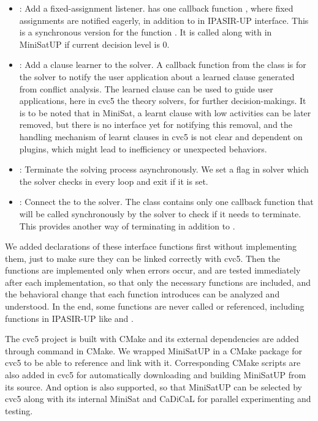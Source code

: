 \begin{itemize}
\begin{itemize}
    \item {}: Add a fixed-assignment listener.  has one callback function , where fixed assignments are notified eagerly, in addition to  in IPASIR-UP interface. This is a synchronous version for the function . It is called along with  in MiniSatUP if current decision level is 0.
    \item {}: Add a clause learner to the solver. A callback function  from the  class is for the solver to notify the user application about a learned clause generated from conflict analysis. The learned clause can be used to guide user applications, here in cvc5 the theory solvers, for further decision-makings. It is to be noted that in MiniSat, a learnt clause with low activities can be later removed, but there is no interface yet for notifying this removal, and the handling mechanism of learnt clauses in cvc5 is not clear and dependent on plugins, which might lead to inefficiency or unexpected behaviors.
    \item {}: Terminate the solving process asynchronously. We set a flag in solver which the solver checks in every loop and exit if it is set.
    \item {}: Connect the  to the solver. The  class contains only one callback function  that will be called synchronously by the solver to check if it needs to terminate. This provides another way of terminating in addition to .
  \end{itemize}
\end{itemize}

We added declarations of these interface functions first without implementing them, just to make sure they can be linked correctly with cvc5. Then the functions are implemented only when errors occur, and are tested immediately after each implementation, so that only the necessary functions are included, and the behavioral change that each function introduces can be analyzed and understood. In the end, some functions are never called or referenced, including functions in IPASIR-UP like  and .

The cvc5 project is built with CMake and its external dependencies are added through command  in CMake. We wrapped MiniSatUP in a CMake package for cvc5 to be able to reference and link with it. Corresponding CMake scripts are also added in cvc5 for automatically downloading and building MiniSatUP from its source. And option  is also supported, so that MiniSatUP can be selected by cvc5 along with its internal MiniSat and CaDiCaL for parallel experimenting and testing.
